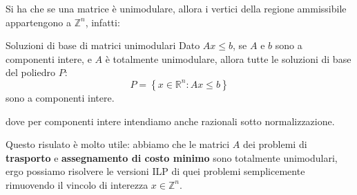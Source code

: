 \documentclass[a4paper,11pt]{article}
\begin{document}
Si ha che se una matrice è unimodulare, allora i vertici della regione ammissibile appartengono a $\mathbb{Z}^n$, infatti:
\begin{theorem}{Soluzioni di base di matrici unimodulari}
	Dato $Ax \leq b$, se $A$ e $b$ sono a componenti intere, e $A$ è totalmente unimodulare, allora tutte le soluzioni di base del poliedro $P$:
	$$
		P = \left\{ x \in \mathbb{R}^n : Ax \leq b \right\}
	$$
	sono a componenti intere.
\end{theorem}
dove per componenti intere intendiamo anche razionali sotto normalizzazione.
\par\smallskip
Questo risulato è molto utile: abbiamo che le matrici $A$ dei problemi di \textbf{trasporto} e \textbf{assegnamento di costo minimo} sono totalmente unimodulari, ergo possiamo risolvere le versioni ILP di quei problemi semplicemente rimuovendo il vincolo di interezza $x \in \mathbb{Z}^n$.
\end{document}
